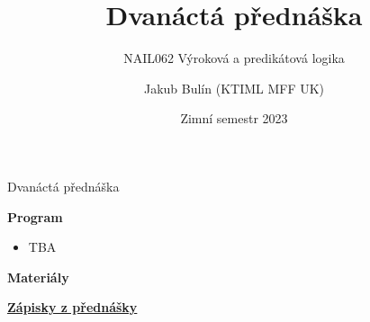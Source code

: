 \documentclass{beamer}
\title{Dvanáctá přednáška}
\subtitle{NAIL062 Výroková a predikátová logika}
\author{Jakub Bulín (KTIML MFF UK)}
\date{Zimní semestr 2023}
\begin{document}
\frame{\titlepage}


\begin{frame}{Dvanáctá přednáška}

    \textbf{Program}
        \begin{itemize}
            \item TBA
        \end{itemize}        
    

    \textbf{Materiály}

        \href{https://github.com/jbulin-mff-uk/nail062/raw/main/lecture/lecture-notes/lecture-notes.pdf}{\alert{\textbf{Zápisky z přednášky}}}%

\end{frame}
\end{document}
